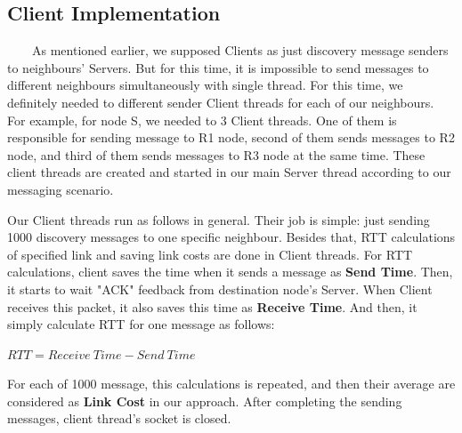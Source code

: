 \documentclass[12pt]{article}
\begin{document}
\subsection{Client Implementation}
\ \ \ \ As mentioned earlier, we supposed Clients as just discovery message senders to neighbours' Servers. But for this time, it is impossible to send messages to different neighbours simultaneously with single thread. For this time, we definitely needed to different sender Client threads for each of our neighbours. For example, for node S, we needed to 3 Client threads. One of them is responsible for sending message to R1 node, second of them sends messages to R2 node, and third of them sends messages to R3 node at the same time. These client threads are created and started in our main Server thread according to our messaging scenario.     

Our Client threads run as follows in general. Their job is simple: just sending 1000 discovery messages to one specific neighbour. Besides that, RTT calculations of specified link and saving link costs are done in Client threads. For RTT calculations, client saves the time when it sends a message as \textbf{Send Time}. Then, it starts to wait "ACK" feedback from destination node's Server. When Client receives this packet, it also saves this time as \textbf{Receive Time}. And then, it simply calculate RTT for one message as follows: 
\begin{center}
$RTT = Receive \ Time - Send \ Time$
\end{center}
For each of 1000 message, this calculations is repeated, and then their average are considered as \textbf{Link Cost} in our approach. After completing the sending messages, client thread's socket is closed.
\end{document}
